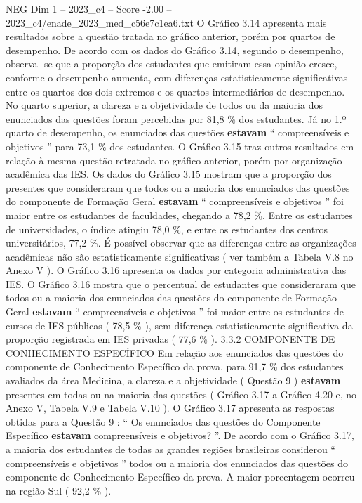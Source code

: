 \begin{textsample}{NEG Dim 1 – 2023\_c4 – Score -2.00 – 2023\_c4/enade\_2023\_med\_c56e7c1ea6.txt}
O Gráfico 3.14 apresenta mais resultados sobre a questão tratada no gráfico anterior, porém por quartos de desempenho.
De acordo com os dados do Gráfico 3.14, segundo o desempenho, observa -se que a proporção dos estudantes que emitiram essa opinião cresce, conforme o desempenho aumenta, com diferenças estatisticamente significativas entre os quartos dos dois extremos e os quartos intermediários de desempenho.
No quarto superior, a clareza e a objetividade de todos ou da maioria dos enunciados das questões foram percebidas por 81,8 \% dos estudantes.
Já no 1.º quarto de desempenho, os enunciados das questões \textbf{estavam} “ compreensíveis e objetivos ” para 73,1 \% dos estudantes.
O Gráfico 3.15 traz outros resultados em relação à mesma questão retratada no gráfico anterior, porém por organização acadêmica das IES.
Os dados do Gráfico 3.15 mostram que a proporção dos presentes que consideraram que todos ou a maioria dos enunciados das questões do componente de Formação Geral \textbf{estavam} “ compreensíveis e objetivos ” foi maior entre os estudantes de faculdades, chegando a 78,2 \%.
Entre os estudantes de universidades, o índice atingiu 78,0 \%, e entre os estudantes dos centros universitários, 77,2 \%.
É possível observar que as diferenças entre as organizações acadêmicas não são estatisticamente significativas ( ver também a Tabela V.8 no Anexo V ).
O Gráfico 3.16 apresenta os dados por categoria administrativa das IES.
O Gráfico 3.16 mostra que o percentual de estudantes que consideraram que todos ou a maioria dos enunciados das questões do componente de Formação Geral \textbf{estavam} “ compreensíveis e objetivos ” foi maior entre os estudantes de cursos de IES públicas ( 78,5 \% ), sem diferença estatisticamente significativa da proporção registrada em IES privadas ( 77,6 \% ). 3.3.2 COMPONENTE DE CONHECIMENTO ESPECÍFICO Em relação aos enunciados das questões do componente de Conhecimento Específico da prova, para 91,7 \% dos estudantes avaliados da área Medicina, a clareza e a objetividade ( Questão 9 ) \textbf{estavam} presentes em todas ou na maioria das questões ( Gráfico 3.17 a Gráfico 4.20 e, no Anexo V, Tabela V.9 e Tabela V.10 ).
O Gráfico 3.17 apresenta as respostas obtidas para a Questão 9 : “ Os enunciados das questões do Componente Específico \textbf{estavam} compreensíveis e objetivos? ”.
De acordo com o Gráfico 3.17, a maioria dos estudantes de todas as grandes regiões brasileiras considerou “ compreensíveis e objetivos ” todos ou a maioria dos enunciados das questões do componente de Conhecimento Específico da prova.
A maior porcentagem ocorreu na região Sul ( 92,2 \% ).

\end{textsample}
